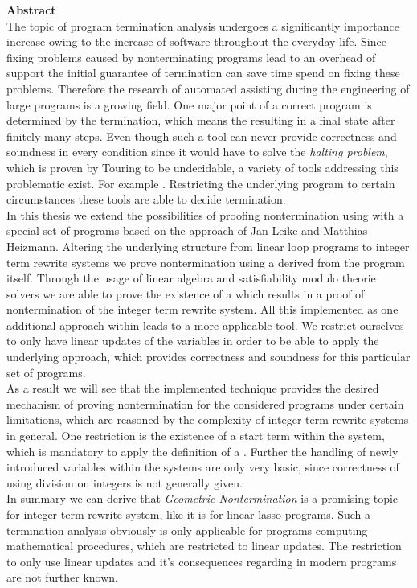 {\bf\Large Abstract} \\ [1em] 

The topic of program termination analysis undergoes a significantly importance increase owing to the increase of software throughout the everyday life. Since fixing problems caused by nonterminating programs lead to an overhead of support the initial guarantee of termination can save time spend on fixing these problems. Therefore the research of automated assisting during the engineering of large programs is a growing field.
One major point of a correct program is determined by the termination, which means the resulting in a final state after finitely many steps. Even though such a tool can never provide correctness and soundness in every condition since it would have to solve the \textit{halting problem}, which is proven by Touring to be undecidable, a variety of tools addressing this problematic exist. For example \aprove. Restricting the underlying program to certain circumstances these tools are able to decide termination.\newline \\
In this thesis we extend the possibilities of proofing nontermination using \aprove with a special set of programs based on the  approach of Jan Leike and Matthias Heizmann. Altering the underlying structure from linear loop programs to integer term rewrite systems we prove nontermination using a \gna derived from the program itself. Through the usage of linear algebra and satisfiability modulo theorie solvers we are able to prove the existence of a \gna which results in a proof of nontermination of the integer term rewrite system. All this implemented as one additional approach within \aprove leads to a more applicable tool. We restrict ourselves to only have linear updates of the variables in order to be able to apply the underlying approach, which provides correctness and soundness for this particular set of programs.\newline
\\
As a result we will see that the implemented technique provides the desired mechanism of proving nontermination for the considered programs under certain limitations, which are reasoned by the complexity of integer term rewrite systems in general. One restriction is the existence of a start term within the system, which is mandatory to apply the definition of a \gna. Further the handling of newly introduced variables within the systems are only very basic, since correctness of using division on integers is not generally given. \newline
\\
In summary we can derive that \textit{Geometric Nontermination} is a promising topic for integer term rewrite system, like it is for linear lasso programs. Such a termination analysis obviously is only applicable for programs computing mathematical procedures, which are restricted to linear updates. The restriction to only use linear updates and it's consequences regarding in modern programs are not further known.

